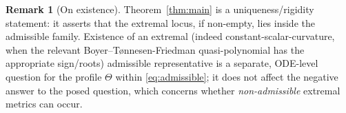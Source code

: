\documentclass{amsart}
\theoremstyle{definition}
\newtheorem{remark}{Remark}
\begin{document}
\begin{remark}[On existence]
Theorem~\ref{thm:main} is a uniqueness/rigidity statement: it asserts that the
extremal locus, if non-empty, lies inside the admissible family. Existence of an
extremal (indeed constant-scalar-curvature, when the relevant
Boyer--T\o nnesen-Friedman quasi-polynomial has the appropriate sign/roots)
admissible representative is a separate, ODE-level question for the profile
$\Theta$ within \eqref{eq:admissible}; it does not affect the negative answer to
the posed question, which concerns whether \emph{non-admissible} extremal
metrics can occur.
\end{remark}
\end{document}
